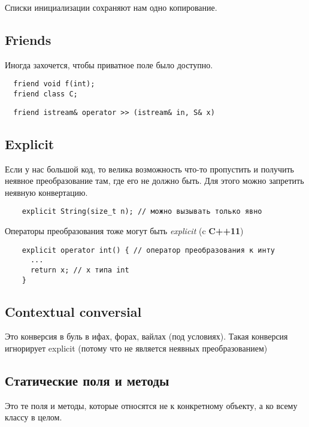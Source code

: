 \documentclass[12pt]{article}
\newcommand{\cppEleven}{\textbf{C++11}}
\begin{document}
Списки инициализации сохраняют нам одно копирование.
 
\subsection{Friends}

Иногда захочется, чтобы приватное поле было доступно. 

\begin{lstlisting}
  friend void f(int);
  friend class C;
\end{lstlisting}
 
 
\begin{lstlisting}
  friend istream& operator >> (istream& in, S& x)
\end{lstlisting}
 
\subsection{Explicit}

Если у нас большой код, то велика возможность что-то пропустить и получить неявное преобразование там, где его не должно быть. Для этого можно запретить неявную конвертацию. 

\begin{lstlisting}
	explicit String(size_t n); // можно вызывать только явно
\end{lstlisting}



Операторы преобразования тоже могут быть \textit{explicit} (c \cppEleven )
\begin{lstlisting}
	explicit operator int() { // оператор преобразования к инту
	  ...
	  return x; // x типа int 
	}
\end{lstlisting}

\subsection{Contextual conversial}

Это конверсия в буль в ифах, форах, вайлах (под условиях). Такая конверсия игнорирует explicit (потому что не является неявных преобразованием)

\subsection{Статические поля и методы}
Это те поля и методы, которые относятся не к конкретному объекту, а ко всему классу в целом. 
\end{document}
